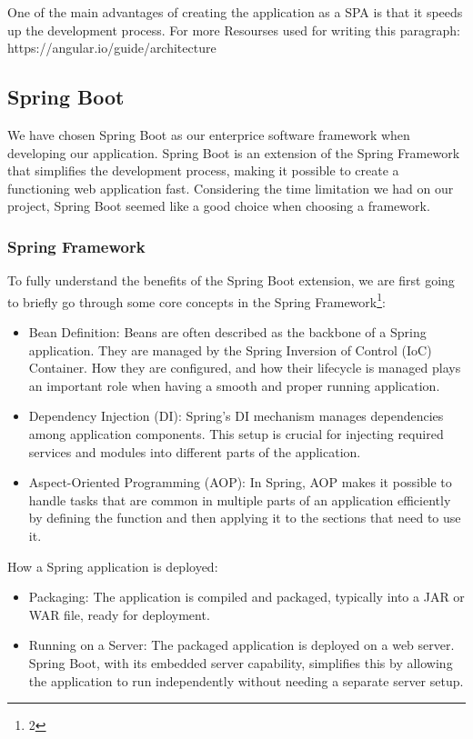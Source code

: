 One of the main advantages of creating the application as a SPA is that it speeds up the development
process.
For more 
Resourses used for writing this paragraph: https://angular.io/guide/architecture 

\subsection{Spring Boot}
\label{subsec:springboot}

We have chosen Spring Boot as our enterprice software framework when developing our application. Spring Boot is an extension of the Spring Framework that simplifies the development process, making it possible to create a functioning web application fast. Considering the time limitation we had on our project, Spring Boot seemed like a good choice when choosing a framework. 

\subsubsection{Spring Framework}

To fully understand the benefits of the Spring Boot extension, we are first going to briefly go through some core concepts in the Spring Framework\footnote{2}:

\begin{itemize}
    	\item Bean Definition: Beans are often described as the backbone of a Spring application. They are managed by the Spring Inversion of Control (IoC) Container. How they are configured, and how their lifecycle is managed plays an important role when having a smooth and proper running application. 
    \item Dependency Injection (DI): Spring's DI mechanism manages dependencies among application components. This setup is crucial for injecting required services and modules into different parts of the application.
    \item Aspect-Oriented Programming (AOP): In Spring, AOP makes it possible to handle tasks that are common in multiple parts of an application efficiently by defining the function and then applying it to the sections that need to use it.
\end{itemize}

How a Spring application is deployed:

\begin{itemize}
    \item Packaging: The application is compiled and packaged, typically into a JAR or WAR file, ready for deployment.
    \item Running on a Server: The packaged application is deployed on a web server. Spring Boot, with its embedded server capability, simplifies this by allowing the application to run independently without needing a separate server setup.
\end{itemize}

